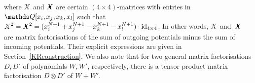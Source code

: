 \documentclass{compositio}
\theoremstyle{definition}
\numberwithin{equation}{section}
\begin{document}
where $\Xcirc$ and $\Xbul$ are certain $(4\times 4)$-matrices with entries in $\nQ[x_{i},x_{j},x_{k},x_{l}]$ such that $\Xcirc^2=\Xbul^2 = (x^{N+1}_{i}+x^{N+1}_{j}-x^{N+1}_{k}-x^{N+1}_{l})\cdot\operatorname{id}_{4\times 4}$. In other words, $\Xcirc$ and~$\Xbul$ are matrix factorisations of the sum of outgoing potentials minus the sum of incoming potentials. Their explicit expressions are given in Section~\ref{KRconstruction}. We also note that for two general matrix factorisations $D,D'$  of polynomials $W,W'$, respectively, there is a tensor product matrix factorisation $D\otimes D'$ of $W+W'$. 
\end{document}
